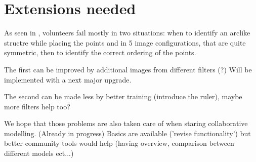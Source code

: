 \section{Extensions needed} \label{sec:todo}

As seen in , volunteers fail mostly in two situations:
when to identify an arclike structre while placing the points
and in 5 image configurations, that are quite symmetric, then to identify the correct ordering of the points.

The first can be improved by additional images from different filters (?)
Will be implemented with a next major \spl upgrade.

The second can be made less by better training (introduce the ruler), maybe more filters help too?

We hope that those problems are also taken care of when staring collaborative modelling. (Already in progress)
Basics are available ('revise functionality') but better community tools would help (having overview, comparison between different models ect...)